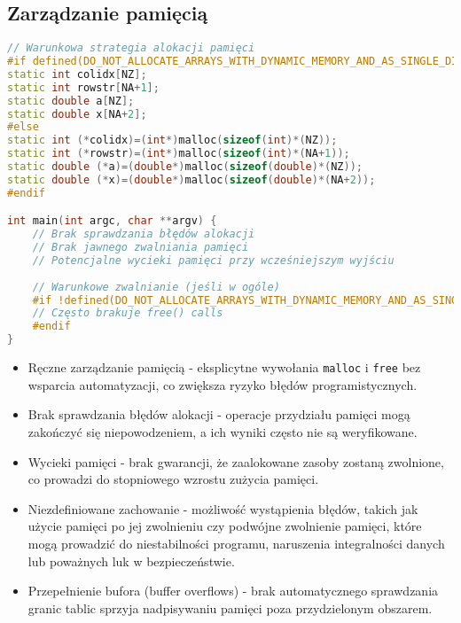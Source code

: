 \subsection{Zarządzanie pamięcią}
\begin{lstlisting}[language=C++, caption={Zarządzanie pamięcią w benchmarkach C++ z OpenMP}, label={lst:openmp_memory}]
// Warunkowa strategia alokacji pamięci
#if defined(DO_NOT_ALLOCATE_ARRAYS_WITH_DYNAMIC_MEMORY_AND_AS_SINGLE_DIMENSION)
static int colidx[NZ];
static int rowstr[NA+1];
static double a[NZ];
static double x[NA+2];
#else
static int (*colidx)=(int*)malloc(sizeof(int)*(NZ));
static int (*rowstr)=(int*)malloc(sizeof(int)*(NA+1));
static double (*a)=(double*)malloc(sizeof(double)*(NZ));
static double (*x)=(double*)malloc(sizeof(double)*(NA+2));
#endif

int main(int argc, char **argv) {
    // Brak sprawdzania błędów alokacji
    // Brak jawnego zwalniania pamięci
    // Potencjalne wycieki pamięci przy wcześniejszym wyjściu
    
    // Warunkowe zwalnianie (jeśli w ogóle)
    #if !defined(DO_NOT_ALLOCATE_ARRAYS_WITH_DYNAMIC_MEMORY_AND_AS_SINGLE_DIMENSION)
    // Często brakuje free() calls
    #endif
}
\end{lstlisting}
\begin{itemize}
    \item Ręczne zarządzanie pamięcią - eksplicytne wywołania \texttt{malloc} i \texttt{free} bez wsparcia automatyzacji, co zwiększa ryzyko błędów programistycznych.
    
    \item Brak sprawdzania błędów alokacji - operacje przydziału pamięci mogą zakończyć się niepowodzeniem, a ich wyniki często nie są weryfikowane.
    
    \item Wycieki pamięci - brak gwarancji, że zaalokowane zasoby zostaną zwolnione, co prowadzi do stopniowego wzrostu zużycia pamięci.
    
    \item Niezdefiniowane zachowanie - możliwość wystąpienia błędów, takich jak użycie pamięci po jej zwolnieniu czy podwójne zwolnienie pamięci, które mogą prowadzić do niestabilności programu, naruszenia integralności danych lub poważnych luk w bezpieczeństwie.
    
    \item Przepełnienie bufora (buffer overflows) - brak automatycznego sprawdzania granic tablic sprzyja nadpisywaniu pamięci poza przydzielonym obszarem.
\end{itemize}
  
